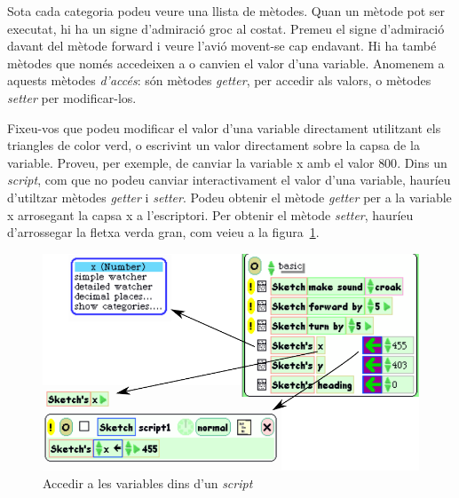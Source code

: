 Sota cada categoria podeu veure una llista de mètodes. Quan un mètode pot ser executat, hi ha un signe d'admiració groc al costat. Premeu el signe d'admiració davant del mètode \textsf{forward} i veure l'avió movent-se cap endavant. Hi ha també mètodes que només accedeixen a o canvien el valor d'una variable. Anomenem a aquests mètodes \emph{d'accés}: són mètodes \emph{getter}, per accedir als valors, o mètodes \emph{setter} per modificar-los.    

Fixeu-vos que podeu modificar el valor d'una variable directament utilitzant els triangles de color verd, o escrivint un valor directament sobre la capsa de la variable. Proveu, per exemple, de canviar la variable \textsf{x} amb el valor \textsf{800}. Dins un \emph{script}, com que no podeu canviar interactivament el valor d'una variable, hauríeu d'utiltzar mètodes \emph{getter} i \emph{setter}. Podeu obtenir el mètode \emph{getter} per a la variable \textsf{x} arrosegant la capsa \textsf{x} a l'escriptori. Per obtenir el mètode \emph{setter}, hauríeu d'arrossegar la fletxa verda gran, com veieu a la figura~\ref{fig2406}.
\begin{figure}[h!]
\begin{center}
\includegraphics[scale=0.75]{Imatges/figura24-6}
\end{center}
\caption{Accedir a les variables dins d'un \emph{script}}
\label{fig2406}
\end{figure}


